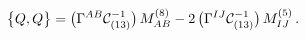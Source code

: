 \begin{equation}
\label{e:osp84QQ}
\big\{Q, Q\big\} = 
     \big(\Gamma^{AB} {\cal C}^{-1}_{(13)}\big)\, M^{(8)}_{AB}
 -2\,\big(\Gamma^{IJ} {\cal C}^{-1}_{(13)}\big)\, M^{(5)}_{IJ}\, .
\end{equation}

